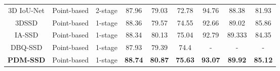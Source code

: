 \begin{table}
{\begin{tabular}{c|c|c|ccc|ccc}
		3D IoU-Net \cite{li20203d}              & Point-based                & 2-stage               & 87.96          & 79.03          & 72.78          & 94.76          & 88.38          & 81.93           \\
		3DSSD \cite{yang20203dssd}                   & Point-based                & 1-stage               & 88.36          & 79.57          & 74.55          & 92.66          & 89.02          & 85.86           \\
		IA-SSD \cite{zhang2022not}                  & Point-based                & 1-stage               & 88.34          & 80.13          & 75.04          & 92.79          & 89.333         & 84.35           \\
		DBQ-SSD \cite{yang2022dbq}                 & Point-based                & 1-stage               & 87.93          & 79.39          & 74.4           & -              & -              & -               \\
		\textbf{PDM-SSD}                 & Point-based                & 1-stage               & \textbf{88.74} & \textbf{80.87} & \textbf{75.63} & \textbf{93.07} & \textbf{89.92} & \textbf{85.12}  \\
		\bottomrule
	\end{tabular} }
	\label{tabel1}
\end{table}

